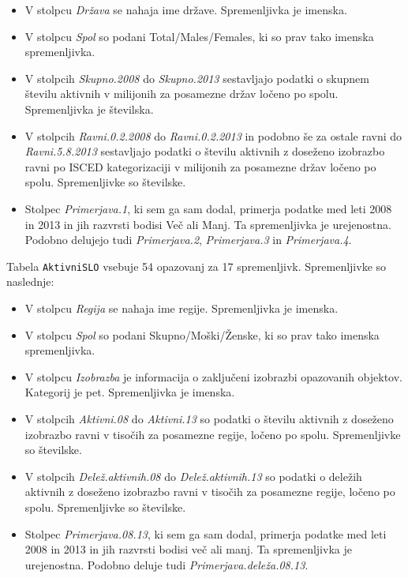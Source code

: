 \documentclass[11pt,a4paper]{article}
\begin{document}
\begin{itemize}
  \item V stolpcu \textit{Država} se nahaja ime države. Spremenljivka je imenska.
  \item V stolpcu \textit{Spol} so podani Total/Males/Females, ki so prav tako imenska spremenljivka.
  \item V stolpcih \textit{Skupno.2008} do \textit{Skupno.2013} sestavljajo podatki o skupnem številu aktivnih v milijonih  za posamezne držav ločeno po spolu. Spremenljivka je številska.
  \item V stolpcih \textit{Ravni.0.2.2008} do \textit{Ravni.0.2.2013} in podobno še za ostale ravni do \textit{Ravni.5.8.2013} sestavljajo podatki o številu aktivnih z do\-se\-že\-no izobrazbo ravni po ISCED kategorizaciji v milijonih za posamezne držav ločeno po spolu. Spremenljivke so številske.  
  \item Stolpec \textit{Primerjava.1}, ki sem ga sam dodal, primerja podatke med leti 2008 in 2013 in jih razvrsti bodisi Več ali Manj. Ta spremenljivka je urejenostna. Podobno delujejo tudi \textit{Primerjava.2}, \textit{Primerjava.3} in \textit{Primerjava.4}.
\end{itemize}

Tabela \verb|AktivniSLO| vsebuje 54 opazovanj za 17 spremenljivk. Spremenljivke so naslednje:

\begin{itemize}
  \item V stolpcu \textit{Regija} se nahaja ime regije. Spremenljivka je imenska.
  \item V stolpcu \textit{Spol} so podani Skupno/Moški/Ženske, ki so prav tako imenska spremenljivka.
  \item V stolpcu \textit{Izobrazba} je informacija o zaključeni izobrazbi opazovanih objektov. Kategorij je pet. Spremenljivka je imenska.
  \item V stolpcih \textit{Aktivni.08} do \textit{Aktivni.13} so podatki o številu aktivnih z doseženo izobrazbo ravni v tisočih za posamezne regije, ločeno po spolu. Spremenljivke so številske.
   \item V stolpcih \textit{Delež.aktivnih.08} do \textit{Delež.aktivnih.13} so podatki o deležih aktivnih z doseženo izobrazbo ravni v tisočih za posamezne regije, ločeno po spolu. Spremenljivke so številske.
   \item Stolpec \textit{Primerjava.08.13}, ki sem ga sam dodal, primerja podatke med leti 2008 in 2013 in jih razvrsti bodisi več ali manj. Ta spremenljivka je urejenostna. Podobno deluje tudi \textit{Primerjava.deleža.08.13}.
\end{itemize}
\end{document}
